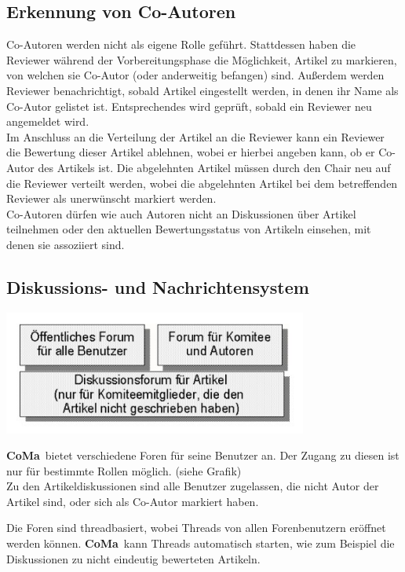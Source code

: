 \documentclass[headexclude,footexclude,12pt,BCOR0pt,DIV15]{scrartcl}
\newcommand{\CoMa}{\textbf{CoMa}}
\begin{document}
    \subsection{Erkennung von Co-Autoren} \label{CoAutoren}
        Co-Autoren werden nicht als eigene Rolle gef\"{u}hrt. Stattdessen haben die Reviewer w\"{a}hrend der Vorbereitungsphase die
        M\"{o}glichkeit, Artikel zu markieren, von welchen sie Co-Autor (oder anderweitig befangen) sind. Au{\ss}erdem werden Reviewer
        benachrichtigt, sobald Artikel eingestellt werden, in denen ihr Name als Co-Autor gelistet ist. Entsprechendes wird
        gepr\"{u}ft, sobald ein Reviewer neu angemeldet wird. \\
        Im Anschluss an die Verteilung der Artikel an die Reviewer kann ein Reviewer die Bewertung dieser Artikel ablehnen,
        wobei er hierbei angeben kann, ob er Co-Autor des Artikels ist.
        Die abgelehnten Artikel m\"{u}ssen durch den Chair neu auf die Reviewer verteilt werden, wobei die abgelehnten
        Artikel bei dem betreffenden Reviewer als unerw\"{u}nscht markiert werden. \\
        Co-Autoren d\"{u}rfen wie auch Autoren nicht an Diskussionen \"{u}ber Artikel teilnehmen oder den aktuellen Bewertungsstatus
        von Artikeln einsehen, mit denen sie assoziiert sind.

    \subsection{Diskussions- und Nachrichtensystem}
        \begin{center}\includegraphics[width=10cm]{forum1}\end{center}
        \CoMa\ bietet verschiedene Foren f\"{u}r seine Benutzer an. Der Zugang zu diesen ist nur f\"{u}r bestimmte Rollen
            m\"{o}glich. (siehe Grafik)\\
            Zu den Artikeldiskussionen sind alle Benutzer zugelassen, die nicht Autor der Artikel sind, oder sich als
            Co-Autor markiert haben.

            Die Foren sind threadbasiert, wobei Threads von allen Forenbenutzern er\"{o}ffnet werden k\"{o}nnen. \CoMa\ kann
            Threads automatisch starten, wie zum Beispiel die Diskussionen zu nicht eindeutig bewerteten Artikeln.
\end{document}
